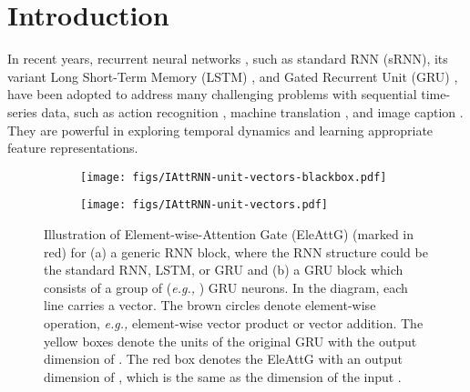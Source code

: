 \documentclass[runningheads]{llncs}
\newcommand{\Outer}{Element-wise}
\begin{document}
\section{Introduction}

In recent years, recurrent neural networks \cite{lipton2015critical}, such as standard RNN (sRNN), its variant Long Short-Term Memory (LSTM) \cite{hochreiter1997long}, and Gated Recurrent Unit (GRU) \cite{cho2014learning}, have been adopted to address many challenging problems with sequential time-series data, such as action recognition \cite{du2015hierarchical}, machine translation \cite{cho14}, and image caption \cite{vinyals2015show}. They are powerful in exploring temporal dynamics and learning appropriate feature representations.


\begin{figure}[!t]
	\centering
	\begin{subfigure}[t]{0.43\linewidth}
		\centering\texttt{[image: figs/IAttRNN-unit-vectors-blackbox.pdf]}
		\caption{}
		\label{subfig:generalRNN}
	\end{subfigure}	
	\begin{subfigure}[t]{0.52\linewidth}
		\centering\texttt{[image: figs/IAttRNN-unit-vectors.pdf]}
		\caption{}			
		\label{subfig:EleGGRU}
	\end{subfigure}
\caption[]{Illustration of \Outer-Attention Gate (EleAttG) (marked in red) for (a) a generic RNN block, where the RNN structure could be the standard RNN, LSTM, or GRU and (b) a GRU block which consists of a group of ({\it e.g.,} ) GRU neurons. In the diagram, each line carries a vector. The brown circles denote element-wise operation, {\it e.g.,} element-wise vector product or vector addition. The yellow boxes denote the units of the original GRU with the output dimension of . The red box denotes the EleAttG with an output dimension of , which is the same as the dimension of the input .}\label{fig:IAttRNN}
\end{figure}
\end{document}
